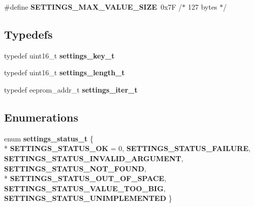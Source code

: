 \begin{DoxyCompactItemize}
\item 
\hypertarget{group__settings__lib_ga9fde18a6fbfc2f2a7e8d8360c95d29db}{}\#define {\bfseries S\+E\+T\+T\+I\+N\+G\+S\+\_\+\+M\+A\+X\+\_\+\+V\+A\+L\+U\+E\+\_\+\+S\+I\+Z\+E}~0x7\+F        /$\ast$ 127 bytes $\ast$/\label{group__settings__lib_ga9fde18a6fbfc2f2a7e8d8360c95d29db}

\end{DoxyCompactItemize}
\subsection*{Typedefs}
\begin{DoxyCompactItemize}
\item 
\hypertarget{group__settings__lib_gafdcd055150f9fb7bea18b3d397a6818c}{}typedef uint16\+\_\+t {\bfseries settings\+\_\+key\+\_\+t}\label{group__settings__lib_gafdcd055150f9fb7bea18b3d397a6818c}

\item 
\hypertarget{group__settings__lib_ga8504abb492015cd9df51b2f2d4980beb}{}typedef uint16\+\_\+t {\bfseries settings\+\_\+length\+\_\+t}\label{group__settings__lib_ga8504abb492015cd9df51b2f2d4980beb}

\item 
\hypertarget{group__settings__lib_ga8970d85e120cd7afe18d432082c3d050}{}typedef eeprom\+\_\+addr\+\_\+t {\bfseries settings\+\_\+iter\+\_\+t}\label{group__settings__lib_ga8970d85e120cd7afe18d432082c3d050}

\end{DoxyCompactItemize}
\subsection*{Enumerations}
\begin{DoxyCompactItemize}
\item 
\hypertarget{group__settings__lib_gab69d02b4e5008886566210355c6ca316}{}enum {\bfseries settings\+\_\+status\+\_\+t} \{ \\*
{\bfseries S\+E\+T\+T\+I\+N\+G\+S\+\_\+\+S\+T\+A\+T\+U\+S\+\_\+\+O\+K} = 0, 
{\bfseries S\+E\+T\+T\+I\+N\+G\+S\+\_\+\+S\+T\+A\+T\+U\+S\+\_\+\+F\+A\+I\+L\+U\+R\+E}, 
{\bfseries S\+E\+T\+T\+I\+N\+G\+S\+\_\+\+S\+T\+A\+T\+U\+S\+\_\+\+I\+N\+V\+A\+L\+I\+D\+\_\+\+A\+R\+G\+U\+M\+E\+N\+T}, 
{\bfseries S\+E\+T\+T\+I\+N\+G\+S\+\_\+\+S\+T\+A\+T\+U\+S\+\_\+\+N\+O\+T\+\_\+\+F\+O\+U\+N\+D}, 
\\*
{\bfseries S\+E\+T\+T\+I\+N\+G\+S\+\_\+\+S\+T\+A\+T\+U\+S\+\_\+\+O\+U\+T\+\_\+\+O\+F\+\_\+\+S\+P\+A\+C\+E}, 
{\bfseries S\+E\+T\+T\+I\+N\+G\+S\+\_\+\+S\+T\+A\+T\+U\+S\+\_\+\+V\+A\+L\+U\+E\+\_\+\+T\+O\+O\+\_\+\+B\+I\+G}, 
{\bfseries S\+E\+T\+T\+I\+N\+G\+S\+\_\+\+S\+T\+A\+T\+U\+S\+\_\+\+U\+N\+I\+M\+P\+L\+E\+M\+E\+N\+T\+E\+D}
 \}\label{group__settings__lib_gab69d02b4e5008886566210355c6ca316}

\end{DoxyCompactItemize}
